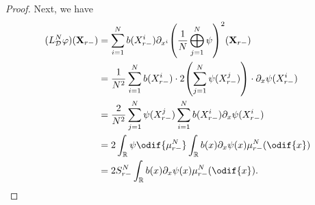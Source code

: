 \begin{proof}
  Next, we have
  \begin{equation}
    \begin{split}
      (L_{\cD}^{N} \varphi) (\bm{X}_{r-})
       & = \sum_{i=1}^N b(X_{r-}^i) \partial_{x^i}\br*{ \frac{1}{N} \bigoplus_{j=1}^N \psi }^2 (\bm{X}_{r-})                  \\
       & = \frac{1}{N^2} \sum_{i=1}^N b(X_{r-}^i) \cdot 2 \br*{ \sum_{j=1}^N \psi(X_{r-}^j) } \cdot \partial_x \psi(X_{r-}^i) \\
       & = \frac{2}{N^2} \sum_{j=1}^N \psi(X_{r-}^j) \sum_{i=1}^N b(X_{r-}^i) \partial_x \psi(X_{r-}^i)                       \\
       & = 2 \int_\potspace \psi \odif{\mu_{r-}^N} \int_\potspace b(x) \partial_x \psi (x) \mu_{r-}^N(\odif{x})               \\
       & = 2 S_{r-}^N \int_\potspace b(x) \partial_x \psi (x) \mu_{r-}^N(\odif{x}).
    \end{split}
  \end{equation}


\end{proof}
